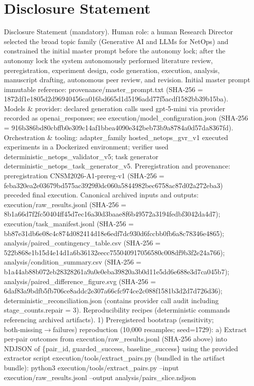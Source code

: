 \documentclass[conference]{IEEEtran}
\begin{document}
\section*{Disclosure Statement}
Disclosure Statement (mandatory). Human role: a human Research Director selected the broad topic family (Generative AI and LLMs for NetOps) and constrained the initial master prompt before the autonomy lock; after the autonomy lock the system autonomously performed literature review, preregistration, experiment design, code generation, execution, analysis, manuscript drafting, autonomous peer review, and revision. Initial master prompt immutable reference: provenance/master\_prompt.txt (SHA‑256 = 1872df1e1805d2d96940456ca016bd665d1d5196add77f5acdf1582bb39b15ba). Models \& provider: declared generation calls used gpt‑5‑mini via provider recorded as openai\_responses; see execution/model\_configuration.json (SHA‑256 = 916b386bd80cbffb0e309c14af1bbea4090e342beb73b9a8784a0d57da8367fd). Orchestration \& tooling: adapter\_family hosted\_netops\_gvr\_v1 executed experiments in a Dockerized environment; verifier used deterministic\_netops\_validator\_v5; task generator deterministic\_netops\_task\_generator\_v5. Preregistration and provenance: preregistration CNSM2026‑A1‑prereg‑v1 (SHA‑256 = feba320ea2e03679bd575ac3929f0dc060a5844982bec6758ac87d02a272eba3) preceded final execution. Canonical archived inputs and outputs: execution/raw\_results.jsonl (SHA‑256 = 8b1a66d7f2fc50404ff45d7ec16a30d3baae8f6b49572a3194fedbf3042da4d7); execution/task\_manifest.jsonl (SHA‑256 = bb87e31db6e08c4c874d082414d18e6edf7dc930d6fccbb0fb6a8c78346e4865); analysis/paired\_contingency\_table.csv (SHA‑256 = 522b868e1b15d4e14d1a6b36132eecc755040917056580c008df9b3f2e24a766); analysis/condition\_summary.csv (SHA‑256 = b1a44ab88b072eb28328261a9a0e0eba39820a3b0d11e5dd6e688e3d7ca045b7); analysis/paired\_difference\_figure.svg (SHA‑256 = 6daf83a9bdfb5fb706ce8addc2e307a66cfc974ce2c088f1581b3d2d7d726d36); deterministic\_reconciliation.json (contains provider call audit including stage\_counts.repair = 3). Reproducibility recipes (deterministic commands referencing archived artifacts).
1) Preregistered bootstrap (sensitivity; both‑missing\ensuremath{\rightarrow}failures) reproduction (10,000 resamples; seed=1729):
   a) Extract per‑pair outcomes from execution/raw\_results.jsonl (SHA‑256 above) into NDJSON of \{pair\_id, guarded\_success, baseline\_success\} using the provided extractor script execution/tools/extract\_pairs.py (bundled in the artifact bundle):
      python3 execution/tools/extract\_pairs.py --input execution/raw\_results.jsonl --output analysis/pairs\_slice.ndjson
\end{document}
